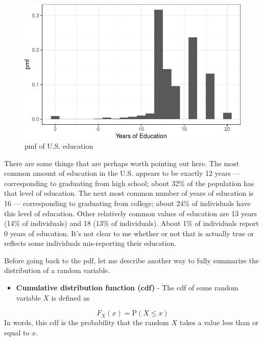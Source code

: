 \documentclass[
  letterpaper,
  DIV=11,
  numbers=noendperiod]{scrreprt}
\providecommand{\tightlist}{%
  \setlength{\itemsep}{0pt}\setlength{\parskip}{0pt}}\usepackage{longtable,booktabs,array}
\begin{document}
\begin{figure}[H]

{\centering \includegraphics{02-probability_files/figure-pdf/unnamed-chunk-3-1.pdf}

}

\caption{pmf of U.S. education}

\end{figure}%

There are some things that are perhaps worth pointing out here. The most
common amount of education in the U.S. appears to be exactly 12 years
--- corresponding to graduating from high school; about 32\% of the
population has that level of education. The next most common number of
years of education is 16 --- corresponding to graduating from college;
about 24\% of individuals have this level of education. Other relatively
common values of education are 13 years (14\% of individuals) and 18
(13\% of individuals). About 1\% of individuals report 0 years of
education. It's not clear to me whether or not that is actually true or
reflects some individuals mis-reporting their education.

Before going back to the pdf, let me describe another way to fully
summarize the distribution of a random variable.

\begin{itemize}
\tightlist
\item
  \textbf{Cumulative distribution function (cdf)} - The cdf of some
  random variable \(X\) is defined as
\end{itemize}

\[
  F_X(x) = \mathrm{P}(X \leq x)
\] In words, this cdf is the probability that the random \(X\) takes a
value less than or equal to \(x\).
\end{document}
